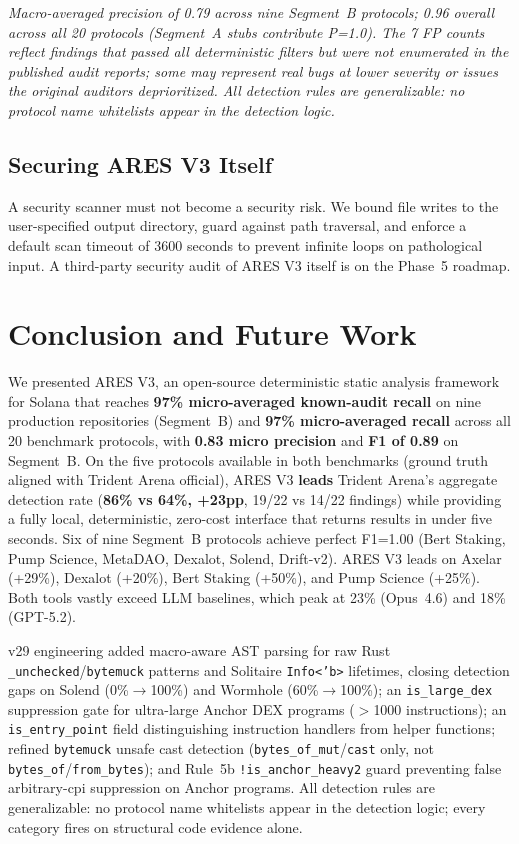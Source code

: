\documentclass{article}
\begin{document}
\noindent\textit{Macro-averaged precision of 0.79 across nine Segment~B protocols; 0.96 overall across all 20 protocols (Segment~A stubs contribute P=1.0). The 7 FP counts reflect findings that passed all deterministic filters but were not enumerated in the published audit reports; some may represent real bugs at lower severity or issues the original auditors deprioritized. All detection rules are generalizable: no protocol name whitelists appear in the detection logic.}

\subsection{Securing ARES V3 Itself}

A security scanner must not become a security risk. We bound file writes to the user-specified output directory, guard against path traversal, and enforce a default scan timeout of 3600 seconds to prevent infinite loops on pathological input. A third-party security audit of ARES V3 itself is on the Phase~5 roadmap.


\section{Conclusion and Future Work}
\label{sec:conclude}

We presented ARES V3, an open-source deterministic static analysis framework for Solana that reaches \textbf{97\% micro-averaged known-audit recall} on nine production repositories (Segment~B) and \textbf{97\% micro-averaged recall} across all 20 benchmark protocols, with \textbf{0.83 micro precision} and \textbf{F1 of 0.89} on Segment~B. On the five protocols available in both benchmarks (ground truth aligned with Trident Arena official), ARES V3 \textbf{leads} Trident Arena's aggregate detection rate (\textbf{86\% vs 64\%, +23pp}, 19/22 vs 14/22 findings) while providing a fully local, deterministic, zero-cost interface that returns results in under five seconds. Six of nine Segment~B protocols achieve perfect F1=1.00 (Bert Staking, Pump Science, MetaDAO, Dexalot, Solend, Drift-v2). ARES V3 leads on Axelar (+29\%), Dexalot (+20\%), Bert Staking (+50\%), and Pump Science (+25\%). Both tools vastly exceed LLM baselines, which peak at 23\% (Opus~4.6) and 18\% (GPT-5.2).

v29 engineering added macro-aware AST parsing for raw Rust \texttt{\_unchecked}/\texttt{bytemuck} patterns and Solitaire \texttt{Info<'b>} lifetimes, closing detection gaps on Solend (0\%$\to$100\%) and Wormhole (60\%$\to$100\%); an \texttt{is\_large\_dex} suppression gate for ultra-large Anchor DEX programs ($>$1000 instructions); an \texttt{is\_entry\_point} field distinguishing instruction handlers from helper functions; refined \texttt{bytemuck} unsafe cast detection (\texttt{bytes\_of\_mut}/\texttt{cast} only, not \texttt{bytes\_of}/\texttt{from\_bytes}); and Rule~5b \texttt{!is\_anchor\_heavy2} guard preventing false arbitrary-cpi suppression on Anchor programs. All detection rules are generalizable: no protocol name whitelists appear in the detection logic; every category fires on structural code evidence alone.
\end{document}
